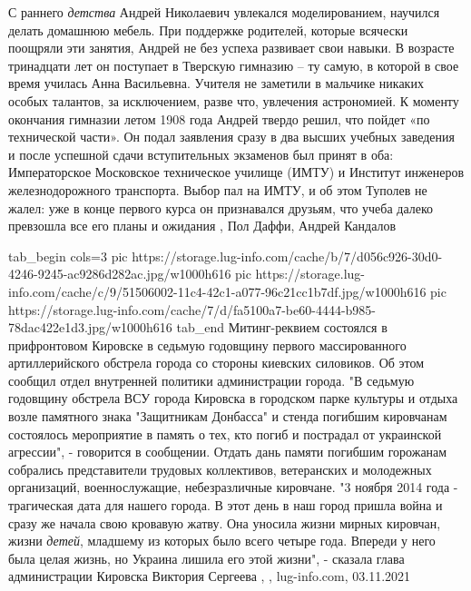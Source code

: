 С раннего \emph{детства} Андрей Николаевич увлекался моделированием, научился делать
домашнюю мебель. При поддержке родителей, которые всячески поощряли эти
занятия, Андрей не без успеха развивает свои навыки. В возрасте тринадцати лет
он поступает в Тверскую гимназию – ту самую, в которой в свое время училась
Анна Васильевна. Учителя не заметили в мальчике никаких особых талантов, за
исключением, разве что, увлечения астрономией. К моменту окончания гимназии
летом 1908 года Андрей твердо решил, что пойдет «по технической части». Он
подал заявления сразу в два высших учебных заведения и после успешной сдачи
вступительных экзаменов был принят в оба: Императорское Московское техническое
училище (ИМТУ) и Институт инженеров железнодорожного транспорта. Выбор пал на
ИМТУ, и об этом Туполев не жалел: уже в конце первого курса он признавался
друзьям, что учеба далеко превзошла все его планы и ожидания
, Пол Даффи, Андрей Кандалов

\ifcmt
  tab_begin cols=3
     pic https://storage.lug-info.com/cache/b/7/d056c926-30d0-4246-9245-ac9286d282ac.jpg/w1000h616
		 pic https://storage.lug-info.com/cache/c/9/51506002-11c4-42c1-a077-96c21cc1b7df.jpg/w1000h616
     pic https://storage.lug-info.com/cache/7/d/fa5100a7-be60-4444-b985-78dac422e1d3.jpg/w1000h616
  tab_end
\fi
Митинг-реквием состоялся в прифронтовом Кировске в седьмую годовщину первого
массированного артиллерийского обстрела города со стороны киевских силовиков.
Об этом сообщил отдел внутренней политики администрации города.  "В седьмую
годовщину обстрела ВСУ города Кировска в городском парке культуры и отдыха
возле памятного знака "Защитникам Донбасса" и стенда погибшим кировчанам
состоялось мероприятие в память о тех, кто погиб и пострадал от украинской
агрессии", - говорится в сообщении.  Отдать дань памяти погибшим горожанам
собрались представители трудовых коллективов, ветеранских и молодежных
организаций, военнослужащие, небезразличные кировчане.  "3 ноября 2014 года -
трагическая дата для нашего города. В этот день в наш город пришла война и
сразу же начала свою кровавую жатву. Она уносила жизни мирных кировчан, жизни
\emph{детей}, младшему из которых было всего четыре года.  Впереди у него была целая
жизнь, но Украина лишила его этой жизни", - сказала глава администрации
Кировска Виктория Сергеева
, 
, lug-info.com, 03.11.2021

